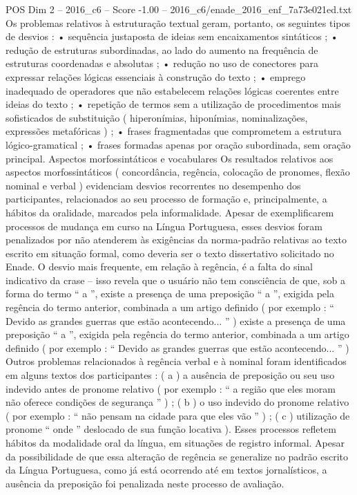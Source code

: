 \begin{textsample}{POS Dim 2 – 2016\_c6 – Score -1.00 – 2016\_c6/enade\_2016\_enf\_7a73e021ed.txt}
Os problemas relativos à estruturação textual geram, portanto, os seguintes tipos de desvios : • sequência justaposta de ideias sem encaixamentos sintáticos ; • redução de estruturas subordinadas, ao lado do aumento na frequência de estruturas coordenadas e absolutas ; • redução no uso de conectores para expressar relações lógicas essenciais à construção do texto ; • emprego inadequado de operadores que não estabelecem relações lógicas coerentes entre ideias do texto ; • repetição de termos sem a utilização de procedimentos mais sofisticados de substituição ( hiperonímias, hiponímias, nominalizações, expressões metafóricas ) ; • frases fragmentadas que comprometem a estrutura lógico-gramatical ; • frases formadas apenas por oração subordinada, sem oração principal.
Aspectos morfossintáticos e vocabulares Os resultados relativos aos aspectos morfossintáticos ( concordância, regência, colocação de pronomes, flexão nominal e verbal ) evidenciam desvios recorrentes no desempenho dos participantes, relacionados ao seu processo de formação e, principalmente, a hábitos da oralidade, marcados pela informalidade.
Apesar de exemplificarem processos de mudança em curso na Língua Portuguesa, esses desvios foram penalizados por não atenderem às exigências da norma-padrão relativas ao texto escrito em situação formal, como deveria ser o texto dissertativo solicitado no Enade.
O desvio mais frequente, em relação à regência, é a falta do sinal indicativo da crase – isso revela que o usuário não tem consciência de que, sob a forma do termo “ a ”, existe a presença de uma preposição “ a ”, exigida pela regência do termo anterior, combinada a um artigo definido ( por exemplo : “ Devido as grandes guerras que estão acontecendo... ” ) existe a presença de uma preposição “ a ”, exigida pela regência do termo anterior, combinada a um artigo definido ( por exemplo : “ Devido as grandes guerras que estão acontecendo... ” ) Outros problemas relacionados à regência verbal e à nominal foram identificados em alguns textos dos participantes : ( a ) a ausência de preposição ou seu uso indevido antes de pronome relativo ( por exemplo : “ a região que eles moram não oferece condições de segurança ” ) ; ( b ) o uso indevido do pronome relativo ( por exemplo : “ não pensam na cidade para que eles vão ” ) ; ( c ) utilização de pronome “ onde ” deslocado de sua função locativa ).
Esses processos refletem hábitos da modalidade oral da língua, em situações de registro informal.
Apesar da possibilidade de que essa alteração de regência se generalize no padrão escrito da Língua Portuguesa, como já está ocorrendo até em textos jornalísticos, a ausência da preposição foi penalizada neste processo de avaliação.

\end{textsample}
